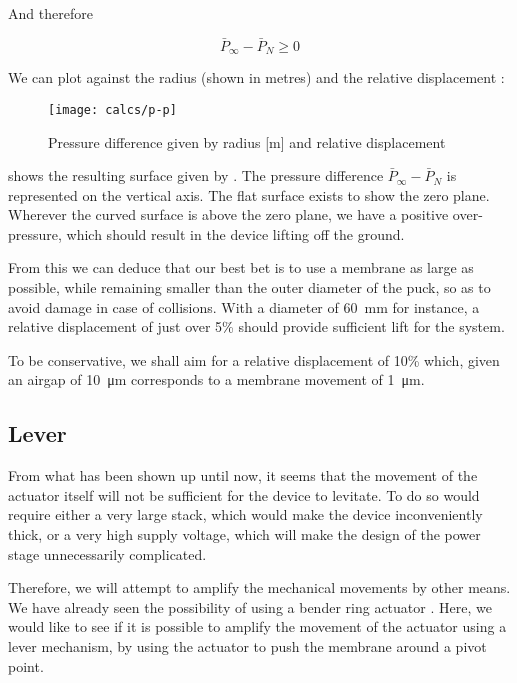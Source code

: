 And therefore

\begin{equation}
  \bar{P}_\infty - \bar{P}_N \geq 0
  \label{eq:pinfty0}
\end{equation}

We can plot  against the radius (shown in metres) and the
relative displacement :

\begin{figure}[h]
  \begin{center}
    \texttt{[image: calcs/p-p]}
  \end{center}
  \caption{Pressure difference given by radius [m] and relative displacement}
  \label{fig:p-p}
\end{figure}

 shows the resulting surface given by . The pressure
difference $\bar{P}_\infty - \bar{P}_N$ is represented on the vertical axis. The
flat surface exists to show the zero plane. Wherever the curved surface is above
the zero plane, we have a positive over-pressure, which should result in the
device lifting off the ground.

From this we can deduce that our best bet is to use a membrane as large as
possible, while remaining smaller than the outer diameter of the puck, so as to
avoid damage in case of collisions. With a diameter of \SI{60}{\milli\metre} for
instance, a relative displacement of just over 5\% should provide sufficient
lift for the system.

To be conservative, we shall aim for a relative displacement of 10\% which,
given an airgap of \SI{10}{\micro\metre} corresponds to a membrane movement of
\SI{1}{\micro\metre}. %

\subsection{Lever}
\label{sub:lever}

From what has been shown up until now, it seems that the movement of the
actuator itself will not be sufficient for the device to levitate. To do so
would require either a very large stack, which would make the device
inconveniently thick, or a very high supply voltage, which will make the design
of the power stage unnecessarily complicated.

Therefore, we will attempt to amplify the mechanical movements by other means.
We have already seen the possibility of using a bender ring actuator
\cite{wiesendanger2001}. Here, we would like to see if it is possible to amplify
the movement of the actuator using a lever mechanism, by using the actuator to
push the membrane around a pivot point.

